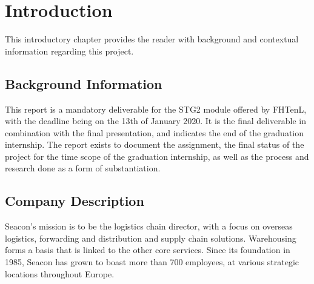\chapter{Introduction}
\label{ch:introduction}
This introductory chapter provides the reader with background and contextual information regarding this project.

\section{Background Information}
\label{sec:background}
This report is a mandatory deliverable for the \gls{STG2} module offered by \gls{FHTenL}, with the deadline being on the 13th of January 2020. It is the final deliverable in combination with the final presentation, and indicates the end of the graduation internship. The report exists to document the assignment, the final status of the project for the time scope of the graduation internship, as well as the process and research done as a form of substantiation.

\section{Company Description}
Seacon's mission is to be the logistics chain director, with a focus on overseas logistics, forwarding and distribution and supply chain solutions. Warehousing forms a basis that is linked to the other core services. Since its foundation in 1985, Seacon has grown to boast more than 700 employees, at various strategic locations throughout Europe.

